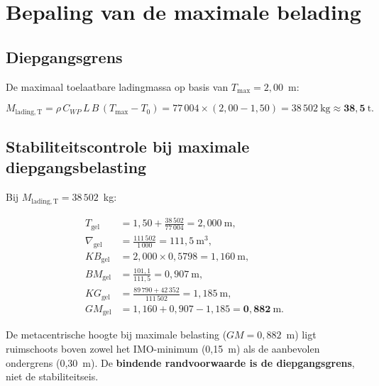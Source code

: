 \section{Bepaling van de maximale belading}
\label{sec:max-belading-resultaat}
 
\subsection{Diepgangsgrens}
 
De maximaal toelaatbare ladingmassa op basis van $T_\mathrm{max} = 2{,}00$~m:
 
\begin{equation}
    M_{\mathrm{lading,T}} = \rho\,C_{WP}\,L\,B\,(T_\mathrm{max} - T_0)
                          = 77\,004 \times (2{,}00 - 1{,}50)
                          = 38\,502\ \mathrm{kg} \approx \mathbf{38{,}5\ \mathrm{t}}.
    \label{eq:M-diepgang}
\end{equation}
 
\subsection{Stabiliteitscontrole bij maximale diepgangsbelasting}
 
Bij $M_\mathrm{lading,T} = 38\,502$~kg:
 
\begin{align}
    T_\mathrm{gel}      &= 1{,}50 + \frac{38\,502}{77\,004} = 2{,}000\ \mathrm{m},
    \label{eq:Tgel-max}\\[4pt]
    \nabla_\mathrm{gel} &= \frac{111\,502}{1\,000} = 111{,}5\ \mathrm{m}^3,
    \label{eq:nabla-max}\\[4pt]
    KB_\mathrm{gel}     &= 2{,}000 \times 0{,}5798 = 1{,}160\ \mathrm{m},
    \label{eq:KB-max}\\[4pt]
    BM_\mathrm{gel}     &= \frac{101{,}1}{111{,}5} = 0{,}907\ \mathrm{m},
    \label{eq:BM-max}\\[4pt]
    KG_\mathrm{gel}     &= \frac{89\,790 + 42\,352}{111\,502} = 1{,}185\ \mathrm{m},
    \label{eq:KG-max}\\[4pt]
    GM_\mathrm{gel}     &= 1{,}160 + 0{,}907 - 1{,}185 = \mathbf{0{,}882\ \mathrm{m}}.
    \label{eq:GM-max}
\end{align}
 
De metacentrische hoogte bij maximale belasting ($GM = 0{,}882$~m) ligt ruimschoots
boven zowel het IMO-minimum (0{,}15~m) als de aanbevolen ondergrens (0{,}30~m).
De \textbf{bindende randvoorwaarde is de diepgangsgrens}, niet de stabiliteitseis.
 
